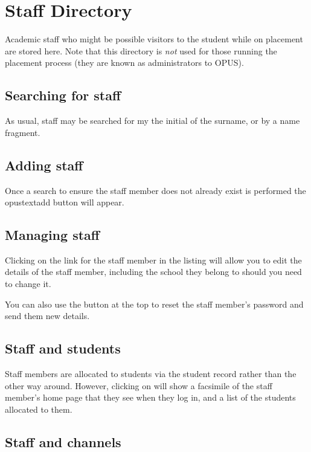\documentclass[12 pt]{book}
\begin{document}
%
%
%

\chapter{Staff Directory}

Academic staff who might be possible visitors to the student while on placement
are stored here. Note that this directory is \emph{not} used for those running
the placement process (they are known as administrators to OPUS).

\section{Searching for staff}

As usual, staff may be searched for my the initial of the surname, or by a
name fragment.

\section{Adding staff}

Once a search to ensure the staff member does not already exist is performed
the opustext{add} button will appear.

\section{Managing staff}

Clicking on the  link for the staff member in the listing will
allow you to edit the details of the staff member, including the school they
belong to should you need to change it.

You can also use the button at the top to reset the staff member's password and
send them new details.

\section{Staff and students}

Staff members are allocated to students via the student record rather than the
other way around. However, clicking on 
will show a facsimile of the staff member's home page that they see when they
log in, and a list of the students allocated to them.

\section{Staff and channels}
\end{document}
